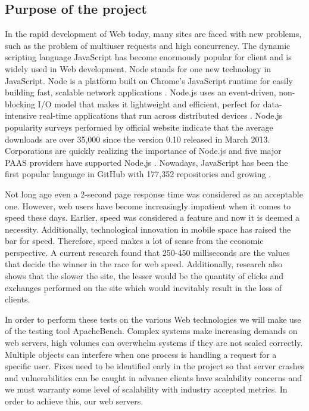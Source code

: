 \documentclass[../thesis.tex]{subfiles}
\begin{document}
\subsection{Purpose of the project}
In the rapid development of Web today, many sites are faced with new problems, such as the problem of multiuser requests and high concurrency. The dynamic scripting language JavaScript has become enormously popular for client and is widely used in Web development. Node stands for one new technology in JavaScript. Node is a platform built on Chrome's JavaScript runtime for easily building fast, scalable network applications \cite{server}. Node.js uses an event-driven, non- blocking I/O model that makes it lightweight and efficient, perfect for data-intensive real-time applications that run across distributed devices \cite{server}. Node.js popularity surveys performed by official website indicate that the average downloads are over 35,000 since the version 0.10 released in March 2013. Corporations are quickly realizing the importance of Node.js and five major PAAS providers have supported Node.js \cite{node}. Nowadays, JavaScript has been the first popular language in GitHub with 177,352 repositories and growing \cite{github-js}. 
\linebreak

Not long ago even a 2-second page response time was considered as an acceptable one. However, web users have become increasingly impatient when it comes to speed these days. Earlier, speed was considered a feature and now it is deemed a necessity. Additionally, technological innovation in mobile space has raised the bar for speed. Therefore, speed makes a lot of sense from the economic perspective. A current research found that 250-450 milliseconds are the values that decide the winner in the race for web speed. Additionally, research also shows that the slower the site, the lesser would be the quantity of clicks and exchanges performed on the site which would inevitably result in the loss of clients.
\linebreak

In order to perform these tests on the various Web technologies we will make use of the testing tool ApacheBench. Complex systems make increasing demands on web servers, high volumes can overwhelm systems if they are not scaled correctly. Multiple objects can interfere when one process is handling a request for a specific user. Fixes need to be identified early in the project so that server crashes and vulnerabilities can be caught in advance clients have scalability concerns and we must warranty some level of scalability with industry accepted metrics. In order to achieve this, our web servers.
\linebreak
\end{document}

